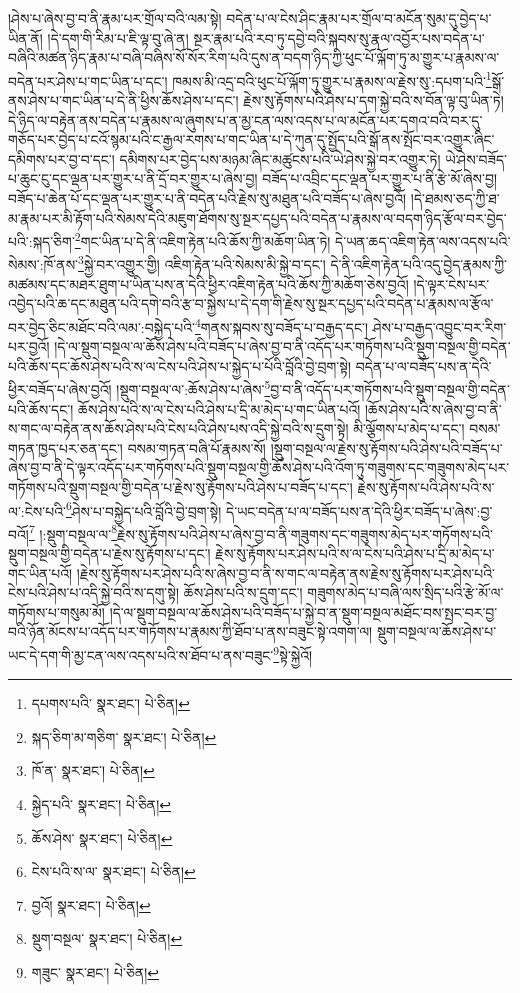 །ཤེས་པ་ཞེས་བྱ་བ་ནི་རྣམ་པར་གྲོལ་བའི་ལམ་སྟེ། བདེན་པ་ལ་ངེས་ཤིང་རྣམ་པར་གྲོལ་བ་མངོན་སུམ་དུ་བྱེད་པ་ཡིན་ནོ། །དེ་དག་གི་རིམ་པ་ཇི་ལྟ་བུ་ཞེ་ན། སྔར་རྣམ་པའི་རབ་ཏུ་དབྱེ་བའི་སྐབས་སུ་རྣལ་འབྱོར་པས་བདེན་པ་བཞིའི་མཚན་ཉིད་རྣམ་པ་བཞི་བཞིས་སོ་སོར་རིག་པའི་དུས་ན་བདག་ཉིད་ཀྱི་ཕུང་པོ་ལྐོག་ཏུ་མ་གྱུར་པ་རྣམས་ལ་བདེན་པར་ཤེས་པ་གང་ཡིན་པ་དང་། ཁམས་མི་འདྲ་བའི་ཕུང་པོ་ལྐོག་ཏུ་གྱུར་པ་རྣམས་ལ་རྗེས་སུ་:དཔག་པའི་\footnote{དཔགས་པའི་  སྣར་ཐང་།  པེ་ཅིན། }སྒོ་ནས་ཤེས་པ་གང་ཡིན་པ་དེ་ནི་ཕྱིས་ཆོས་ཤེས་པ་དང་། རྗེས་སུ་རྟོགས་པའི་ཤེས་པ་དག་སྐྱེ་བའི་ས་བོན་ལྟ་བུ་ཡིན་ཏེ། དེ་ཉིད་ལ་བརྟེན་ནས་བདེན་པ་རྣམས་ལ་ཞུགས་པ་ན་མྱ་ངན་ལས་འདས་པ་ལ་མངོན་པར་དགའ་བའི་བར་དུ་གཅོད་པར་བྱེད་པ་ངའོ་སྙམ་པའི་ང་རྒྱལ་རགས་པ་གང་ཡིན་པ་དེ་ཀུན་དུ་སྤྱོད་པའི་སྒོ་ནས་སྤོང་བར་འགྱུར་ཞིང་དམིགས་པར་བྱ་བ་དང་། དམིགས་པར་བྱེད་པས་མཉམ་ཞིང་མཚུངས་པའི་ཡེ་ཤེས་སྐྱེ་བར་འགྱུར་ཏེ། ཡེ་ཤེས་བཟོད་པ་ཆུང་ངུ་དང་ལྡན་པར་གྱུར་པ་ནི་དྲོ་བར་གྱུར་པ་ཞེས་བྱ། བཟོད་པ་འབྲིང་དང་ལྡན་པར་གྱུར་པ་ནི་རྩེ་མོ་ཞེས་བྱ། བཟོད་པ་ཆེན་པོ་དང་ལྡན་པར་གྱུར་པ་ནི་བདེན་པའི་རྗེས་སུ་མཐུན་པའི་བཟོད་པ་ཞེས་བྱའོ། །དེ་ཐམས་ཅད་ཀྱི་ཐ་མ་རྣམ་པར་མི་རྟོག་པའི་སེམས་དེའི་མཇུག་ཐོགས་སུ་སྔར་དཔྱད་པའི་བདེན་པ་རྣམས་ལ་བདག་ཉིད་རྩོལ་བར་བྱེད་པའི་:སྐད་ཅིག་\footnote{སྐད་ཅིག་མ་གཅིག་  སྣར་ཐང་།  པེ་ཅིན། }གང་ཡིན་པ་དེ་ནི་འཇིག་རྟེན་པའི་ཆོས་ཀྱི་མཆོག་ཡིན་ཏེ། དེ་ཡན་ཆད་འཇིག་རྟེན་ལས་འདས་པའི་སེམས་:ཁོ་ནས་\footnote{ཁོ་ན་  སྣར་ཐང་།  པེ་ཅིན། }སྐྱེ་བར་འགྱུར་གྱི། འཇིག་རྟེན་པའི་སེམས་མི་སྐྱེ་བ་དང་། དེ་ནི་འཇིག་རྟེན་པའི་འདུ་བྱེད་རྣམས་ཀྱི་མཚམས་དང་མཐར་ཐུག་པ་ཡིན་པས་ན་དེའི་ཕྱིར་འཇིག་རྟེན་པའི་ཆོས་ཀྱི་མཆོག་ཅེས་བྱའོ། །དེ་ལྟར་ངེས་པར་འབྱེད་པའི་ཆ་དང་མཐུན་པའི་དགེ་བའི་རྩ་བ་སྐྱེས་པ་དེ་དག་གི་རྗེས་སུ་སྔར་དཔྱད་པའི་བདེན་པ་རྣམས་ལ་རྩོལ་བར་བྱེད་ཅིང་མཐོང་བའི་ལམ་:བསྐྱེད་པའི་\footnote{སྐྱེད་པའི་  སྣར་ཐང་།  པེ་ཅིན། }གནས་སྐབས་སུ་བཟོད་པ་བརྒྱད་དང་། ཤེས་པ་བརྒྱད་འབྱུང་བར་རིག་པར་བྱའོ། །དེ་ལ་སྡུག་བསྔལ་ལ་ཆོས་ཤེས་པའི་བཟོད་པ་ཞེས་བྱ་བ་ནི་འདོད་པར་གཏོགས་པའི་སྡུག་བསྔལ་གྱི་བདེན་པའི་ཆོས་དང་ཆོས་ཤེས་པའི་ས་ལ་ངེས་པའི་ཤེས་པ་སྐྱེད་པ་པོའི་བློའི་བྱེ་བྲག་སྟེ། བདེན་པ་ལ་བཟོད་པས་ན་དེའི་ཕྱིར་བཟོད་པ་ཞེས་བྱའོ། །སྡུག་བསྔལ་ལ་:ཆོས་ཤེས་པ་ཞེས་\footnote{ཆོས་ཤེས་  སྣར་ཐང་།  པེ་ཅིན། }བྱ་བ་ནི་འདོད་པར་གཏོགས་པའི་སྡུག་བསྔལ་གྱི་བདེན་པའི་ཆོས་དང་། ཆོས་ཤེས་པའི་ས་ལ་ངེས་པའི་ཤེས་པ་དྲི་མ་མེད་པ་གང་ཡིན་པའོ། །ཆོས་ཤེས་པའི་ས་ཞེས་བྱ་བ་ནི་ས་གང་ལ་བརྟེན་ནས་ཆོས་ཤེས་པའི་ངེས་པའི་ཤེས་པས་འདི་སྐྱེ་བའི་ས་དྲུག་སྟེ། མི་ལྕོགས་པ་མེད་པ་དང་། བསམ་གཏན་ཁྱད་པར་ཅན་དང་། བསམ་གཏན་བཞི་པོ་རྣམས་སོ། །སྡུག་བསྔལ་ལ་རྗེས་སུ་རྟོགས་པའི་ཤེས་པའི་བཟོད་པ་ཞེས་བྱ་བ་ནི་དེ་ལྟར་འདོད་པར་གཏོགས་པའི་སྡུག་བསྔལ་གྱི་ཆོས་ཤེས་པའི་འོག་ཏུ་གཟུགས་དང་གཟུགས་མེད་པར་གཏོགས་པའི་སྡུག་བསྔལ་གྱི་བདེན་པ་རྗེས་སུ་རྟོགས་པའི་ཤེས་པ་བཟོད་པ་དང་། རྗེས་སུ་རྟོགས་པའི་ཤེས་པའི་ས་ལ་:ངེས་པའི་\footnote{ངེས་པའི་ས་ལ་  སྣར་ཐང་།  པེ་ཅིན། }ཤེས་པ་བསྐྱེད་པའི་བློའི་བྱེ་བྲག་སྟེ། དེ་ཡང་བདེན་པ་ལ་བཟོད་པས་ན་དེའི་ཕྱིར་བཟོད་པ་ཞེས་:བྱ་བའོ།\footnote{བྱའོ།  སྣར་ཐང་།  པེ་ཅིན། } །:སྡུག་བསྔལ་ལ་\footnote{སྡུག་བསྔལ་  སྣར་ཐང་།  པེ་ཅིན། }རྗེས་སུ་རྟོགས་པའི་ཤེས་པ་ཞེས་བྱ་བ་ནི་གཟུགས་དང་གཟུགས་མེད་པར་གཏོགས་པའི་སྡུག་བསྔལ་གྱི་བདེན་པ་རྗེས་སུ་རྟོགས་པ་དང་། རྗེས་སུ་རྟོགས་པར་ཤེས་པའི་ས་ལ་ངེས་པའི་ཤེས་པ་དྲི་མ་མེད་པ་གང་ཡིན་པའོ། །རྗེས་སུ་རྟོགས་པར་ཤེས་པའི་ས་ཞེས་བྱ་བ་ནི་ས་གང་ལ་བརྟེན་ནས་རྗེས་སུ་རྟོགས་པར་ཤེས་པའི་ངེས་པའི་ཤེས་པ་འདི་སྐྱེ་བའི་ས་དགུ་སྟེ། ཆོས་ཤེས་པའི་ས་དྲུག་དང་། གཟུགས་མེད་པ་བཞི་ལས་སྲིད་པའི་རྩེ་མོ་ལ་གཏོགས་པ་གསུམ་མོ། །དེ་ལ་སྡུག་བསྔལ་ལ་ཆོས་ཤེས་པའི་བཟོད་པ་སྐྱེ་བ་ན་སྡུག་བསྔལ་མཐོང་བས་སྤང་བར་བྱ་བའི་ཉོན་མོངས་པ་འདོད་པར་གཏོགས་པ་རྣམས་ཀྱི་ཐོབ་པ་ནས་བཟུང་སྟེ་འགག་ལ། སྡུག་བསྔལ་ལ་ཆོས་ཤེས་པ་ཡང་དེ་དག་གི་མྱ་ངན་ལས་འདས་པའི་ས་ཐོབ་པ་ནས་བཟུང་\footnote{གཟུང་  སྣར་ཐང་།  པེ་ཅིན། }སྟེ་སྐྱེའོ། 